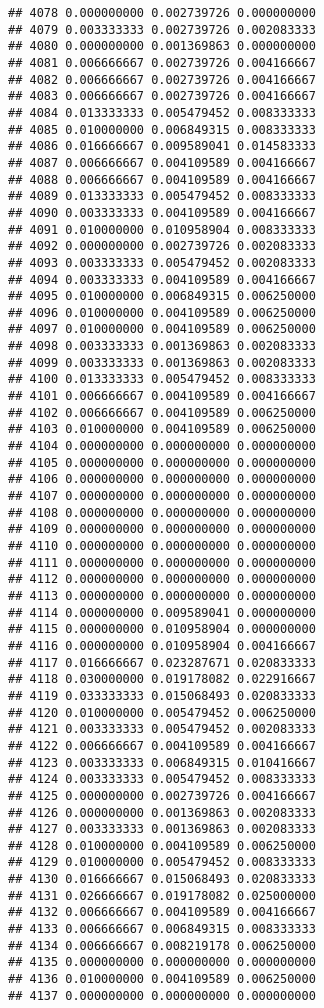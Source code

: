 \documentclass[
]{article}
\begin{document}
\begin{verbatim}
## 4078 0.000000000 0.002739726 0.000000000
## 4079 0.003333333 0.002739726 0.002083333
## 4080 0.000000000 0.001369863 0.000000000
## 4081 0.006666667 0.002739726 0.004166667
## 4082 0.006666667 0.002739726 0.004166667
## 4083 0.006666667 0.002739726 0.004166667
## 4084 0.013333333 0.005479452 0.008333333
## 4085 0.010000000 0.006849315 0.008333333
## 4086 0.016666667 0.009589041 0.014583333
## 4087 0.006666667 0.004109589 0.004166667
## 4088 0.006666667 0.004109589 0.004166667
## 4089 0.013333333 0.005479452 0.008333333
## 4090 0.003333333 0.004109589 0.004166667
## 4091 0.010000000 0.010958904 0.008333333
## 4092 0.000000000 0.002739726 0.002083333
## 4093 0.003333333 0.005479452 0.002083333
## 4094 0.003333333 0.004109589 0.004166667
## 4095 0.010000000 0.006849315 0.006250000
## 4096 0.010000000 0.004109589 0.006250000
## 4097 0.010000000 0.004109589 0.006250000
## 4098 0.003333333 0.001369863 0.002083333
## 4099 0.003333333 0.001369863 0.002083333
## 4100 0.013333333 0.005479452 0.008333333
## 4101 0.006666667 0.004109589 0.004166667
## 4102 0.006666667 0.004109589 0.006250000
## 4103 0.010000000 0.004109589 0.006250000
## 4104 0.000000000 0.000000000 0.000000000
## 4105 0.000000000 0.000000000 0.000000000
## 4106 0.000000000 0.000000000 0.000000000
## 4107 0.000000000 0.000000000 0.000000000
## 4108 0.000000000 0.000000000 0.000000000
## 4109 0.000000000 0.000000000 0.000000000
## 4110 0.000000000 0.000000000 0.000000000
## 4111 0.000000000 0.000000000 0.000000000
## 4112 0.000000000 0.000000000 0.000000000
## 4113 0.000000000 0.000000000 0.000000000
## 4114 0.000000000 0.009589041 0.000000000
## 4115 0.000000000 0.010958904 0.000000000
## 4116 0.000000000 0.010958904 0.004166667
## 4117 0.016666667 0.023287671 0.020833333
## 4118 0.030000000 0.019178082 0.022916667
## 4119 0.033333333 0.015068493 0.020833333
## 4120 0.010000000 0.005479452 0.006250000
## 4121 0.003333333 0.005479452 0.002083333
## 4122 0.006666667 0.004109589 0.004166667
## 4123 0.003333333 0.006849315 0.010416667
## 4124 0.003333333 0.005479452 0.008333333
## 4125 0.000000000 0.002739726 0.004166667
## 4126 0.000000000 0.001369863 0.002083333
## 4127 0.003333333 0.001369863 0.002083333
## 4128 0.010000000 0.004109589 0.006250000
## 4129 0.010000000 0.005479452 0.008333333
## 4130 0.016666667 0.015068493 0.020833333
## 4131 0.026666667 0.019178082 0.025000000
## 4132 0.006666667 0.004109589 0.004166667
## 4133 0.006666667 0.006849315 0.008333333
## 4134 0.006666667 0.008219178 0.006250000
## 4135 0.000000000 0.000000000 0.000000000
## 4136 0.010000000 0.004109589 0.006250000
## 4137 0.000000000 0.000000000 0.000000000

\end{verbatim}
\end{document}

